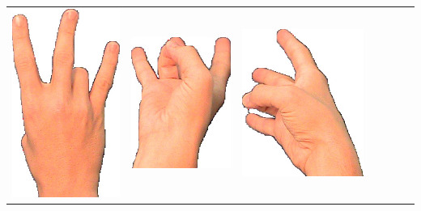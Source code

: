 \documentclass{article}
\begin{document}
\begin{center}
\begin{tabular}{r*{6}{c}}
\includegraphics[scale=0.1]{images/07-01-3.jpg}&
\includegraphics[scale=0.1]{images/07-01-4.jpg}&
\includegraphics[scale=0.1]{images/07-01-5.jpg}&

\end{tabular}
\end{center}
\end{document}
